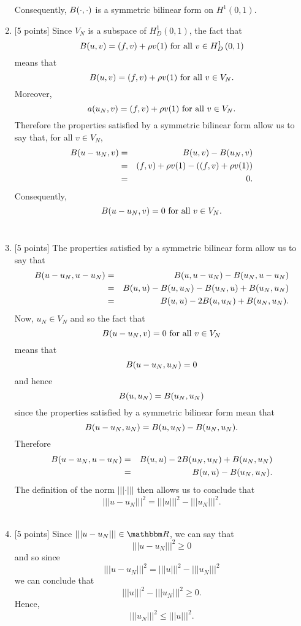 \begin{solution}
\begin{enumerate}
Consequently, $B(\cdot,\cdot)$ is a symmetric bilinear form on $H^1(0,1)$.
\\
\item {[5 points]} Since $V_N$ is a subspace of $H^1_D\left(0,1\right)$, the fact that
\[
B(u,v)=(f,v)+\rho v(1)\mbox{ for all }v\in H^1_D\left(0,1\right)
\]
means that
\[
B(u,v)=(f,v)+\rho v(1)\mbox{ for all }v\in V_N.
\]
Moreover,
\[
a(u_N,v)=(f,v)+\rho v(1)\mbox{ for all }v\in V_N.
\]
Therefore the properties satisfied by a symmetric bilinear form allow us to say that, for all $v\in V_N$,
\begin{eqnarray*}
B(u-u_N,v)&=&B(u,v)-B(u_N,v)
\\
&=&(f,v)+\rho v(1)-\left((f,v)+\rho v(1)\right)
\\
&=&0.
\end{eqnarray*}
Consequently,
\[
B(u-u_N,v)=0\mbox{ for all }v\in V_N.
\]
\\
\item {[5 points]} The properties satisfied by a symmetric bilinear form allow us to say that
\begin{eqnarray*}
B(u-u_N,u-u_N)&=&B(u,u-u_N)-B(u_N,u-u_N)
\\
&=&B(u,u)-B(u,u_N)-B(u_N,u)+B(u_N,u_N)
\\
&=&B(u,u)-2B(u,u_N)+B(u_N,u_N).
\end{eqnarray*}
Now, $u_N\in V_N$ and so the fact that
\[
B(u-u_N,v)=0\mbox{ for all }v\in V_N
\]
means that
\[
B(u-u_N,u_N)=0
\]
and hence
\[
B(u,u_N)=B(u_N,u_N)
\]
since the properties satisfied by a symmetric bilinear form mean that
\[
B(u-u_N,u_N)=B(u,u_N)-B(u_N,u_N).
\]
Therefore
\begin{eqnarray*}
B(u-u_N,u-u_N)&=&B(u,u)-2B(u_N,u_N)+B(u_N,u_N)
\\
&=&B(u,u)-B(u_N,u_N).
\end{eqnarray*}
The definition of the norm $\left|\left|\left|\cdot\right|\right|\right|$ then allows us to conclude that
\[
\left|\left|\left|u-u_N\right|\right|\right|^2=\left|\left|\left|u\right|\right|\right|^2-\left|\left|\left|u_N\right|\right|\right|^2.
\]
\\
\item {[5 points]} Since $\left|\left|\left|u-u_N\right|\right|\right|\in\R$, we can say that
\[
\left|\left|\left|u-u_N\right|\right|\right|^2\ge0
\]
and so since
\[
\left|\left|\left|u-u_N\right|\right|\right|^2=\left|\left|\left|u\right|\right|\right|^2-\left|\left|\left|u_N\right|\right|\right|^2
\]
we can conclude that
\[
\left|\left|\left|u\right|\right|\right|^2-\left|\left|\left|u_N\right|\right|\right|^2\ge0.
\]
Hence,
\[
\left|\left|\left|u_N\right|\right|\right|^2\le\left|\left|\left|u\right|\right|\right|^2.
\]
\end{enumerate}
\end{solution}